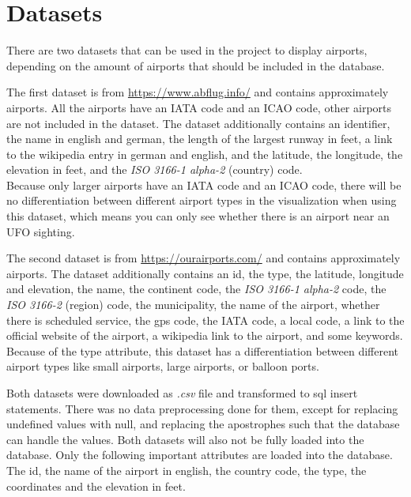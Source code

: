 \documentclass{article}
\begin{document}
\section*{Datasets}
There are two datasets that can be used in the project to display airports, depending on the amount of airports that should be included in the database.
\begin{compactenum}[1.]
\item The first dataset is from \url{https://www.abflug.info/} and contains approximately  airports. All the airports have an IATA code and an ICAO code, other airports are not included in the dataset. The dataset additionally contains an identifier, the name in english and german, the length of the largest runway in feet, a link to the wikipedia entry in german and english, and the latitude, the longitude, the elevation in feet, and the \textit{ISO 3166-1 alpha-2} (country) code.\\
Because only larger airports have an IATA code and an ICAO code, there will be no differentiation between different airport types in the visualization when using this dataset, which means you can only see whether there is an airport near an UFO sighting.
\item The second dataset is from \url{https://ourairports.com/} and contains approximately  airports. The dataset additionally contains an id, the type, the latitude, longitude and elevation, the name, the continent code, the \textit{ISO 3166-1 alpha-2} code, the \textit{ISO 3166-2} (region) code, the municipality, the name of the airport, whether there is scheduled service, the gps code, the IATA code, a local code, a link to the official website of the airport, a wikipedia link to the airport, and some keywords.\\
Because of the type attribute, this dataset has a differentiation between different airport types like small airports, large airports, or balloon ports.
\end{compactenum}
Both datasets were downloaded as \textit{.csv} file and transformed to sql insert statements. There was no data preprocessing done for them, except for replacing undefined values with null, and replacing the apostrophes such that the database can handle the values. Both datasets will also not be fully loaded into the database. Only the following important attributes are loaded into the database. The id, the name of the airport in english, the country code, the type, the coordinates and the elevation in feet.\\
\end{document}
